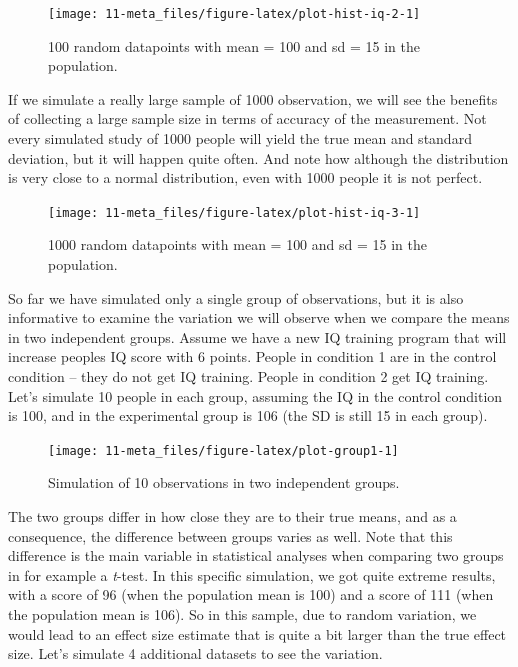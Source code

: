 \documentclass[
  oneside]{book}
\begin{document}
\begin{figure}

{\centering \texttt{[image: 11-meta\_files/figure-latex/plot-hist-iq-2-1]} 

}

\caption{100 random datapoints with mean = 100 and sd = 15 in the population.}\label{fig:plot-hist-iq-2}
\end{figure}

If we simulate a really large sample of 1000 observation, we will see the benefits of collecting a large sample size in terms of accuracy of the measurement. Not every simulated study of 1000 people will yield the true mean and standard deviation, but it will happen quite often. And note how although the distribution is very close to a normal distribution, even with 1000 people it is not perfect.

\begin{figure}

{\centering \texttt{[image: 11-meta\_files/figure-latex/plot-hist-iq-3-1]} 

}

\caption{1000 random datapoints with mean = 100 and sd = 15 in the population.}\label{fig:plot-hist-iq-3}
\end{figure}

So far we have simulated only a single group of observations, but it is also informative to examine the variation we will observe when we compare the means in two independent groups. Assume we have a new IQ training program that will increase peoples IQ score with 6 points. People in condition 1 are in the control condition -- they do not get IQ training. People in condition 2 get IQ training. Let's simulate 10 people in each group, assuming the IQ in the control condition is 100, and in the experimental group is 106 (the SD is still 15 in each group).

\begin{figure}

{\centering \texttt{[image: 11-meta\_files/figure-latex/plot-group1-1]} 

}

\caption{Simulation of 10 observations in two independent groups.}\label{fig:plot-group1}
\end{figure}

The two groups differ in how close they are to their true means, and as a consequence, the difference between groups varies as well. Note that this difference is the main variable in statistical analyses when comparing two groups in for example a \emph{t}-test. In this specific simulation, we got quite extreme results, with a score of 96 (when the population mean is 100) and a score of 111 (when the population mean is 106). So in this sample, due to random variation, we would lead to an effect size estimate that is quite a bit larger than the true effect size. Let's simulate 4 additional datasets to see the variation.
\end{document}
